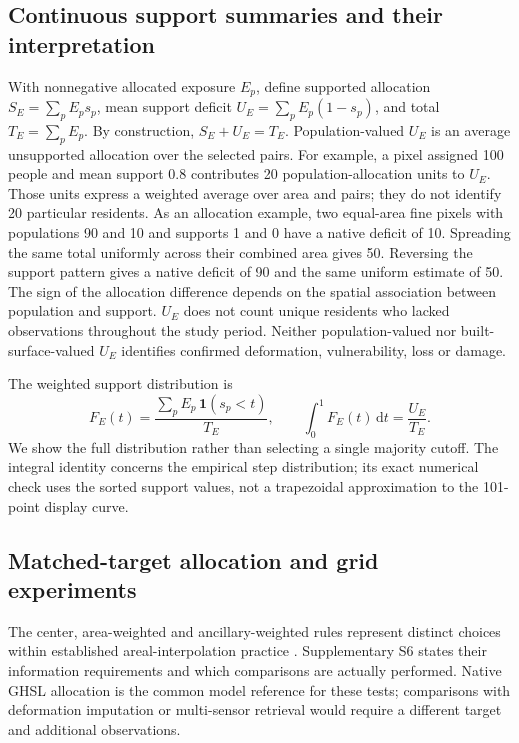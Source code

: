 \documentclass[pdflatex,sn-nature]{sn-jnl}
\begin{document}
\subsection{Continuous support summaries and their interpretation}
With nonnegative allocated exposure $E_p$, define supported allocation $S_E=\sum_p E_p s_p$, mean support deficit $U_E=\sum_p E_p(1-s_p)$, and total $T_E=\sum_p E_p$. By construction, $S_E+U_E=T_E$. Population-valued $U_E$ is an average unsupported allocation over the selected pairs. For example, a pixel assigned 100 people and mean support 0.8 contributes 20 population-allocation units to $U_E$. Those units express a weighted average over area and pairs; they do not identify 20 particular residents. As an allocation example, two equal-area fine pixels with populations 90 and 10 and supports 1 and 0 have a native deficit of 10. Spreading the same total uniformly across their combined area gives 50. Reversing the support pattern gives a native deficit of 90 and the same uniform estimate of 50. The sign of the allocation difference depends on the spatial association between population and support. $U_E$ does not count unique residents who lacked observations throughout the study period. Neither population-valued nor built-surface-valued $U_E$ identifies confirmed deformation, vulnerability, loss or damage.

The weighted support distribution is
\begin{equation}
F_E(t)=\frac{\sum_p E_p\,\mathbf{1}(s_p<t)}{T_E},\qquad
\int_0^1 F_E(t)\,\mathrm{d}t=\frac{U_E}{T_E}.
\end{equation}
We show the full distribution rather than selecting a single majority cutoff. The integral identity concerns the empirical step distribution; its exact numerical check uses the sorted support values, not a trapezoidal approximation to the 101-point display curve.

\subsection{Matched-target allocation and grid experiments}
The center, area-weighted and ancillary-weighted rules represent distinct choices within established areal-interpolation practice \citep{eicher2001dasymetric,mennis2003population}. Supplementary S6 states their information requirements and which comparisons are actually performed. Native GHSL allocation is the common model reference for these tests; comparisons with deformation imputation or multi-sensor retrieval would require a different target and additional observations.
\end{document}
